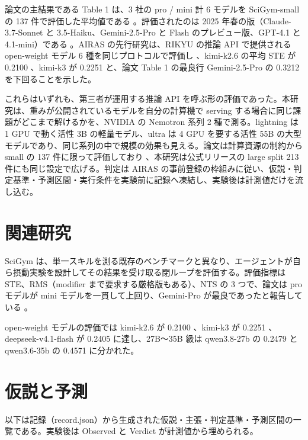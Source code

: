 \documentclass{article}
\providecommand{\unverified}[1]{#1}
\begin{document}
論文の主結果である Table 1 は、3 社の pro / mini 計 6 モデルを SciGym-small の 137 件で評価した平均値である \cite[s1.p2, s1.p6]{duan-2025-measuring}。評価されたのは 2025 年春の版（Claude-3.7-Sonnet と 3.5-Haiku、Gemini-2.5-Pro と Flash のプレビュー版、GPT-4.1 と 4.1-mini）である \cite[s1.p1]{duan-2025-measuring}。AIRAS の先行研究は、RIKYU の推論 API で提供される open-weight モデル 6 種を同じプロトコルで評価し \cite[s3.p1]{scigymrikyuopenmodels-2026-scigym}、kimi-k2.6 の平均 STE が \unverified{0.2100} \cite[s3.p2]{scigymrikyuopenmodels-2026-scigym}、kimi-k3 が \unverified{0.2251} \cite[s3.p3]{scigymrikyuopenmodels-2026-scigym} と、論文 Table 1 の最良行 Gemini-2.5-Pro の \unverified{0.3212} \cite[s1.p5]{duan-2025-measuring} を下回ることを示した。

これらはいずれも、第三者が運用する推論 API を呼ぶ形の評価であった。本研究は、重みが公開されているモデルを自分の計算機で serving する場合に同じ課題がどこまで解けるかを、NVIDIA の Nemotron 系列 2 種で測る。lightning は 1 GPU で動く活性 3B の軽量モデル、ultra は 4 GPU を要する活性 55B の大型モデルであり、同じ系列の中で規模の効果も見える。論文は計算資源の制約から small の 137 件に限って評価しており \cite[s1.p2]{duan-2025-measuring}、本研究は公式リリースの large split 213 件にも同じ設定で広げる。判定は AIRAS の事前登録の枠組みに従い、仮説・判定基準・予測区間・実行条件を実験前に記録へ凍結し、実験後は計測値だけを流し込む。

\section{関連研究}
\label{sec:related}
SciGym \citep{duan-2025-measuring} は、単一スキルを測る既存のベンチマークと異なり、エージェントが自ら摂動実験を設計してその結果を受け取る閉ループを評価する。評価指標は STE、RMS（modifier まで要求する厳格版もある）、NTS の 3 つで、論文は pro モデルが mini モデルを一貫して上回り、Gemini-Pro が最良であったと報告している \cite[s1.p6]{duan-2025-measuring}。

open-weight モデルの評価では kimi-k2.6 が \unverified{0.2100} \cite[s3.p2]{scigymrikyuopenmodels-2026-scigym}、kimi-k3 が \unverified{0.2251} \cite[s3.p3]{scigymrikyuopenmodels-2026-scigym}、deepseek-v4.1-flash が \unverified{0.2405} \cite[s3.p4]{scigymrikyuopenmodels-2026-scigym} に達し、27B〜35B 級は qwen3.8-27b の \unverified{0.2479} \cite[s3.p5]{scigymrikyuopenmodels-2026-scigym} と qwen3.6-35b の \unverified{0.4571} \cite[s3.p6]{scigymrikyuopenmodels-2026-scigym} に分かれた。

\section{仮説と予測}
\label{sec:hypothesis}
以下は記録（record.json）から生成された仮説・主張・判定基準・予測区間の一覧である。実験後は Observed と Verdict が計測値から埋められる。
\end{document}
